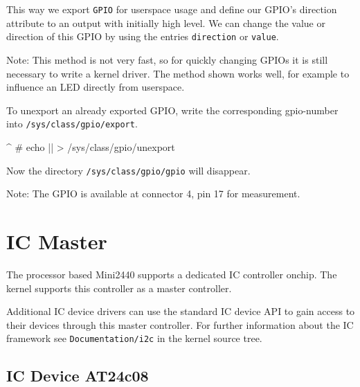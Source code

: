 This way we export \texttt{GPIO\perGpioNumber{}} for userspace usage and define
our GPIO's direction attribute to an output with initially high level. We can
change the value or direction of this GPIO by using the entries
\texttt{direction} or \texttt{value}.

Note: This method is not very fast, so for quickly changing GPIOs it is still
necessary to write a kernel driver. The method shown works well, for example to
influence an LED directly from userspace.

To unexport an already exported GPIO, write the corresponding gpio-number into
\texttt{/sys/class/gpio/export}.

\begin{ptxshell}[escapechar=|]{^}
# echo |\perGpioNumber | > /sys/class/gpio/unexport
\end{ptxshell}

Now the directory \texttt{/sys/class/gpio/gpio\perGpioNumber} will disappear.

Note: The GPIO\perGpioNumber{} is available at connector 4, pin 17 for
measurement.


\section{I\texttwosuperior C Master}			\label{sec:I2C}

The \perCpuName{} processor based Mini2440 supports a dedicated
I\texttwosuperior C controller onchip. The kernel supports this controller as a
master controller.

Additional I\texttwosuperior C device drivers can use the standard
I\texttwosuperior C device API to gain access to their devices through this
master controller.
For further information about the I\texttwosuperior C framework see
\texttt{Documentation/i2c} in the kernel source tree.


\newcommand{\perEepromName}{AT24c08}
\newcommand{\perEepromSize}{1024 bytes}
\newcommand{\perEepromPath}{0-0050}

\subsection{I\texttwosuperior C Device \perEepromName {}}	\label{sec:EEPROM}


